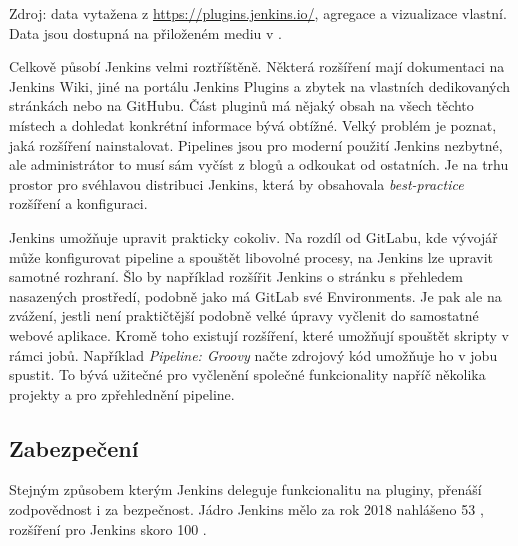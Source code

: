 {\begin{iffigure}
                \caption{Zdroj: data vytažena z \url{https://plugins.jenkins.io/}, agregace a vizualizace vlastní. Data jsou dostupná na přiloženém mediu v .}
            \end{iffigure}
            \clearpage
        }

        Celkově působí Jenkins velmi roztříštěně. Některá rozšíření mají dokumentaci na Jenkins Wiki, jiné na portálu Jenkins Plugins a zbytek na vlastních dedikovaných stránkách nebo na GitHubu. Část pluginů má nějaký obsah na všech těchto místech a dohledat konkrétní informace bývá obtížné. Velký problém je poznat, jaká rozšíření nainstalovat. Pipelines jsou pro moderní použití Jenkins nezbytné, ale administrátor to musí sám vyčíst z blogů a odkoukat od ostatních. Je na trhu prostor pro svéhlavou distribuci Jenkins, která by obsahovala \textit{best-practice} rozšíření a konfiguraci.


        Jenkins umožňuje upravit prakticky cokoliv. Na rozdíl od GitLabu, kde vývojář může konfigurovat pipeline a spouštět libovolné procesy, na Jenkins lze upravit samotné rozhraní. Šlo by například rozšířit Jenkins o stránku s přehledem nasazených prostředí, podobně jako má GitLab své Environments. Je pak ale na zvážení, jestli není praktičtější podobně velké úpravy vyčlenit do samostatné webové aplikace. Kromě toho existují rozšíření, které umožňují spouštět skripty v rámci jobů. Například \textit{Pipeline: Groovy} načte zdrojový kód umožňuje ho v jobu spustit. To bývá užitečné pro vyčlenění společné funkcionality napříč několika projekty a pro zpřehlednění pipeline.

    \subsection{Zabezpečení}
        Stejným způsobem kterým Jenkins deleguje funkcionalitu na pluginy, přenáší zodpovědnost i za bezpečnost. Jádro Jenkins mělo za rok 2018 nahlášeno 53 , rozšíření pro Jenkins skoro 100 \cite{cve-jenkins}. 

        \blind[2]

